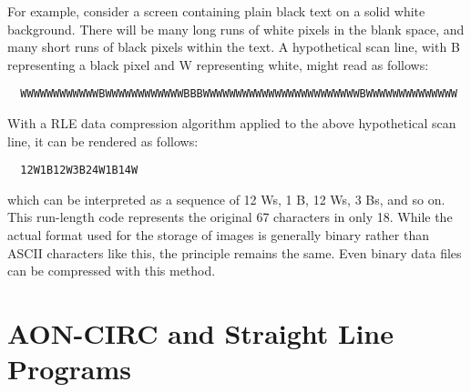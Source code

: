 \documentclass{article}
\begin{document}
  For example, consider a screen containing plain black text on a solid white background. There will be many long runs of white pixels in the blank space, and many short runs of black pixels within the text. A hypothetical scan line, with B representing a black pixel and W representing white, might read as follows: 
  \begin{lstlisting}
  WWWWWWWWWWWWBWWWWWWWWWWWWBBBWWWWWWWWWWWWWWWWWWWWWWWWBWWWWWWWWWWWWWW
  \end{lstlisting}
  With a RLE data compression algorithm applied to the above hypothetical scan line, it can be rendered as follows: 
  \begin{lstlisting}
  12W1B12W3B24W1B14W
  \end{lstlisting}
  which can be interpreted as a sequence of 12 Ws, 1 B, 12 Ws, 3 Bs, and so on. This run-length code represents the original 67 characters in only 18. While the actual format used for the storage of images is generally binary rather than ASCII characters like this, the principle remains the same. Even binary data files can be compressed with this method. 

\section{AON-CIRC and Straight Line Programs}
\end{document}
